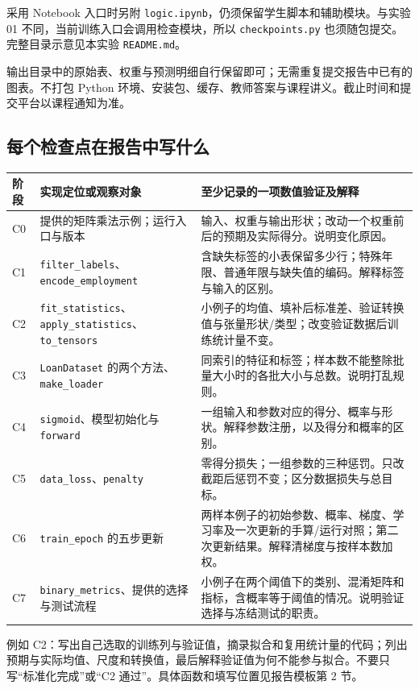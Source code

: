 \documentclass[UTF8,a4paper,11pt,fontset=fandol]{ctexart}
\newcommand{\file}[1]{\nolinkurl{#1}}
\begin{document}
采用 Notebook 入口时另附 \file{logic.ipynb}，仍须保留学生脚本和辅助模块。与实验 01 不同，当前训练入口会调用检查模块，所以 \file{checkpoints.py} 也须随包提交。完整目录示意见本实验 \file{README.md}。

输出目录中的原始表、权重与预测明细自行保留即可；无需重复提交报告中已有的图表。不打包 Python 环境、安装包、缓存、教师答案与课程讲义。截止时间和提交平台以课程通知为准。
\clearpage
\subsection{每个检查点在报告中写什么}
\par\noindent\begin{tabularx}{\linewidth}{L{1cm}L{4.4cm}Y}\toprule
阶段 & 实现定位或观察对象 & 至少记录的一项数值验证及解释\\\midrule
C0 & 提供的矩阵乘法示例；运行入口与版本 & 输入、权重与输出形状；改动一个权重前后的预期及实际得分。说明变化原因。\\
C1 & \file{filter_labels}、\file{encode_employment} & 含缺失标签的小表保留多少行；特殊年限、普通年限与缺失值的编码。解释标签与输入的区别。\\
C2 & \file{fit_statistics}、\file{apply_statistics}、\file{to_tensors} & 小例子的均值、填补后标准差、验证转换值与张量形状/类型；改变验证数据后训练统计量不变。\\
C3 & \file{LoanDataset} 的两个方法、\file{make_loader} & 同索引的特征和标签；样本数不能整除批量大小时的各批大小与总数。说明打乱规则。\\
C4 & \file{sigmoid}、模型初始化与 \file{forward} & 一组输入和参数对应的得分、概率与形状。解释参数注册，以及得分和概率的区别。\\
C5 & \file{data_loss}、\file{penalty} & 零得分损失；一组参数的三种惩罚。只改截距后惩罚不变；区分数据损失与总目标。\\
C6 & \file{train_epoch} 的五步更新 & 两样本例子的初始参数、概率、梯度、学习率及一次更新的手算/运行对照；第二次更新结果。解释清梯度与按样本数加权。\\
C7 & \file{binary_metrics}、提供的选择与测试流程 & 小例子在两个阈值下的类别、混淆矩阵和指标，含概率等于阈值的情况。说明验证选择与冻结测试的职责。\\\bottomrule
\end{tabularx}
\begin{examplebox}[一条记录应能被复核]
例如 C2：写出自己选取的训练列与验证值，摘录拟合和复用统计量的代码；列出预期与实际均值、尺度和转换值，最后解释验证值为何不能参与拟合。不要只写“标准化完成”或“C2 通过”。具体函数和填写位置见报告模板第 2 节。
\end{examplebox}
\clearpage
\end{document}
